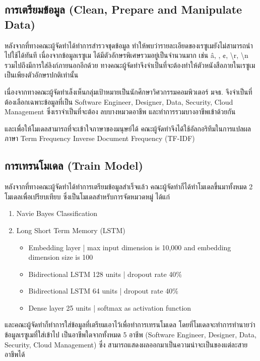 \subsection{การเตรียมข้อมูล (Clean, Prepare and Manipulate Data)}
หลังจากที่ทางคณะผู้จัดทำได้ทำการสำรวจชุดข้อมูล ทำให้พบว่ารายละเอียดของเรซูเมยังไม่สามารถนำไปใช้ได้ทันที
เนื่องจากข้อมูลเรซูเม ได้มีตัวอักษรพิเศษรวมอยู่เป็นจำนวนมาก เช่น \^a, , ¢, \textbackslash r, \textbackslash n
รวมไปถึงมีการใส่ลิงก์ภายนอกอีกด้วย ทางคณะผู้จัดทำจึงจำเป็นที่จะต้องทำให้ตัวหนังสือภายในเรซูเม เป็นเพียงตัวอักษรปกติเท่านั้น
\par เนื่องจากทางคณะผู้จัดทำเล็งเห็นกลุ่มเป้าหมายเป็นนักศึกษาวิศวกรรมคอมพิวเตอร์ มจธ. จึงจำเป็นที่ต้องเลือกเฉพาะข้อมูลที่เป็น
Software Engineer, Designer, Data, Security, Cloud Management ซึ่งเราจำเป็นที่จะต้อง
ลบบางหมวดอาชีพ และทำการรวมบางอาชีพเข้าด้วยกัน
\par และเพื่อให้โมเดลสามารถที่จะเข้าใจภาษาของมนุษย์ได้ คณะผู้จัดทำจึงได้ใช้อัลกอริทึมในการแปลผลภาษา
Term Frequency Inverse Document Frequency (TF-IDF)

\subsection{การเทรนโมเดล (Train Model)}
หลังจากที่ทางคณะผู้จัดทำได้ทำการเตรียมข้อมูลสำเร็จแล้ว คณะผู้จัดทำก็ได้ทำโมเดลขึ้นมาทั้งหมด 2 โมเดลเพื่อเปรียบเทียบ
ซึ่งเป็นโมเดลสำหรับการจัดหมวดหมู่ ได้แก่
\begin{enumerate}
    \item Navie Bayes Classification
    \item Long Short Term Memory (LSTM)
    \begin{itemize}
        \item Embedding layer              | max input dimension is 10,000 and embedding dimension size is 100
        \item Bidirectional LSTM 128 units | dropout rate 40\%
        \item Bidirectional LSTM 64 units  | dropout rate 40\%
        \item Dense layer 25 units         | softmax as activation function
    \end{itemize}
\end{enumerate}
\par และคณะผู้จัดทำก็ทำการใส่ข้อมูลที่เตรียมเอาไว้เพื่อทำการเทรนโมเดล โดยที่โมเดลจะทำการทำนายว่าข้อมูลเรซูเมที่ใส่เข้าไป
เป็นอาชีพใดจากทั้งหมด 5 อาชีพ (Software Engineer, Designer, Data, Security, Cloud Management) ซึ่ง
สามารถแสดงผลออกมาเป็นความน่าจะเป็นของแต่ละสายอาชีพได้

